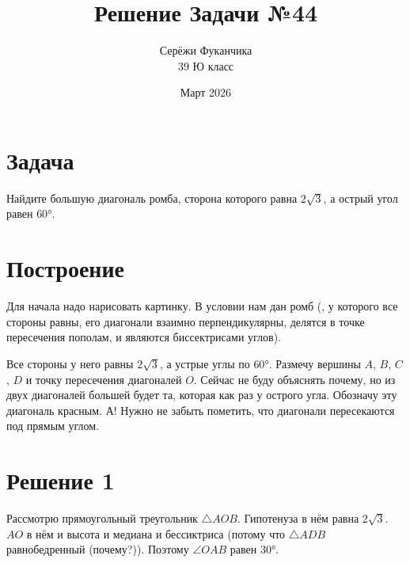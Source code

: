 \documentclass{article}
\title{Решение Задачи №44}
\author{Серёжи Фуканчика\\39 Ю класс}
\date{Март 2026}
\begin{document}
\maketitle

\section{Задача}
Найдите большую диагональ ромба, сторона которого равна $2\sqrt{3}$, а острый угол равен $\ang{60}$.

\section{Построение}
Для начала надо нарисовать картинку. В условии нам дан ромб ({, у которого все стороны равны, его диагонали взаимно перпендикулярны, делятся в точке пересечения пополам, и являются биссектрисами углов}).

Все стороны у него равны $2\sqrt{3}$, а устрые углы по $\ang{60}$. Размечу вершины $A$, $B$, $C$, $D$ и точку пересечения диагоналей $O$. Сейчас не буду объяснять почему, но из двух диагоналей большей будет та, которая как раз у острого угла. Обозначу эту диагональ красным. А! Нужно не забыть пометить, что диагонали пересекаются под прямым углом.

\begin{center}\end{center}

\section{Решение 1}
Рассмотрю прямоугольный треугольник $\triangle{}AOB$. Гипотенуза в нём равна $2\sqrt{3}$. $AO$ в нём и высота и медиана и бессиктриса (потому что $\triangle{}ADB$ равнобедренный (почему?)). Поэтому $\angle{}OAB$ равен $\ang{30}$.
\end{document}
